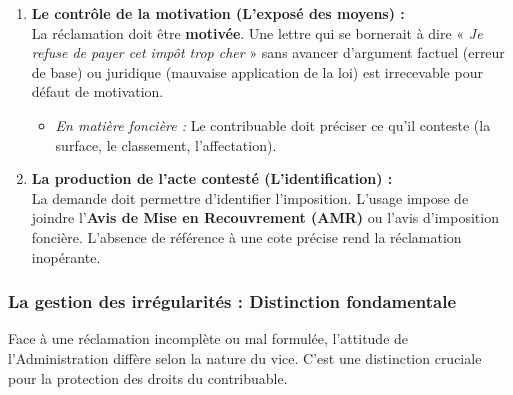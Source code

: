 \documentclass[Cours_contentieuxTF2026.tex]{subfiles}
\begin{document}
\begin{enumerate}
	\item \textbf{Le contrôle de la motivation (L'exposé des moyens) :} \\
	La réclamation doit être \textbf{motivée}. Une lettre qui se bornerait à dire « \textit{Je refuse de payer cet impôt trop cher} » sans avancer d'argument factuel (erreur de base) ou juridique (mauvaise application de la loi) est irrecevable pour défaut de motivation.
	\begin{itemize}
		\item \textit{En matière foncière :} Le contribuable doit préciser ce qu'il conteste (la surface, le classement, l'affectation).
	\end{itemize}
	
	\item \textbf{La production de l'acte contesté (L'identification) :} \\
	La demande doit permettre d'identifier l'imposition. L'usage impose de joindre l'\textbf{Avis de Mise en Recouvrement (AMR)} ou l'avis d'imposition foncière. L'absence de référence à une cote précise rend la réclamation inopérante.
\end{enumerate}

\subsubsection{La gestion des irrégularités : Distinction fondamentale}

Face à une réclamation incomplète ou mal formulée, l'attitude de l'Administration diffère selon la nature du vice. C'est une distinction cruciale pour la protection des droits du contribuable.
\end{document}

